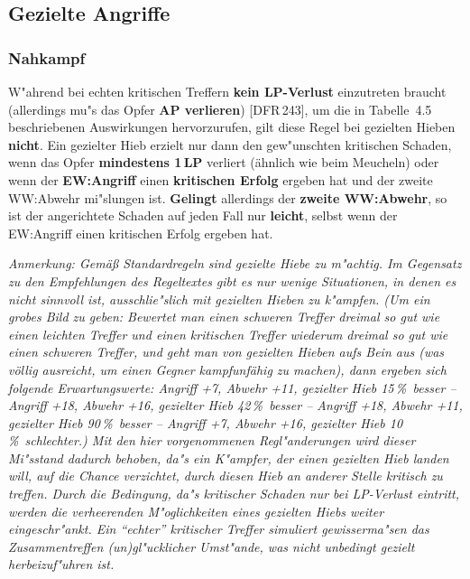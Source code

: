 \documentclass[10pt,a4paper,germanpar]{article}
\begin{document}

\subsection{Gezielte Angriffe}

\subsubsection{Nahkampf}

W"ahrend bei echten kritischen Treffern \textbf{kein LP-Verlust}
einzutreten braucht (allerdings mu"s das Opfer \textbf{AP verlieren})
[DFR\,243], um die in Tabelle~4.5 beschriebenen Auswirkungen
hervorzurufen, gilt diese Regel bei gezielten Hieben
\textbf{nicht}. Ein gezielter Hieb erzielt nur dann den gew"unschten
kritischen Schaden, wenn das Opfer \textbf{mindestens 1\,LP} verliert
(ähnlich wie beim Meucheln) oder wenn der \textbf{EW:Angriff} einen
\textbf{kritischen Erfolg} ergeben hat und der zweite WW:Abwehr
mi"slungen ist. \textbf{Gelingt} allerdings der \textbf{zweite
  WW:Abwehr}, so ist der angerichtete Schaden auf jeden Fall nur
\textbf{leicht}, selbst wenn der EW:Angriff einen kritischen Erfolg
ergeben hat.

\emph{Anmerkung: Gemäß Standardregeln sind gezielte Hiebe zu
  m"achtig. Im Gegensatz zu den Empfehlungen des Regeltextes gibt es
  nur wenige Situationen, in denen es nicht sinnvoll ist,
  ausschlie"slich mit gezielten Hieben zu k"ampfen. (Um ein grobes Bild
  zu geben: Bewertet man einen schweren Treffer dreimal so gut wie
  einen leichten Treffer und einen kritischen Treffer wiederum dreimal so
  gut wie einen schweren Treffer, und geht man von gezielten Hieben
  aufs Bein aus (was völlig ausreicht, um einen Gegner kampfunfähig zu
  machen), dann ergeben sich folgende Erwartungswerte:
  Angriff +7, Abwehr +11, gezielter Hieb 15\,\%\ besser --
  Angriff +18, Abwehr +16, gezielter Hieb 42\,\%\ besser --
  Angriff +18, Abwehr +11, gezielter Hieb 90\,\%\ besser --
  Angriff +7, Abwehr +16, gezielter Hieb 10\,\%\ schlechter.)
  Mit den hier vorgenommenen Regl"anderungen
  wird dieser Mi"sstand dadurch behoben, da"s ein K"ampfer, der einen
  gezielten Hieb landen will, auf die Chance verzichtet, durch diesen
  Hieb an anderer Stelle kritisch zu treffen. Durch die Bedingung,
  da"s kritischer Schaden nur bei LP-Verlust eintritt, werden die
  verheerenden M"oglichkeiten eines gezielten Hiebs weiter
  eingeschr"ankt. Ein "`echter"' kritischer Treffer simuliert
  gewisserma"sen das Zusammentreffen (un)gl"ucklicher Umst"ande, was
  nicht unbedingt gezielt herbeizuf"uhren ist.}
  
\end{document}
